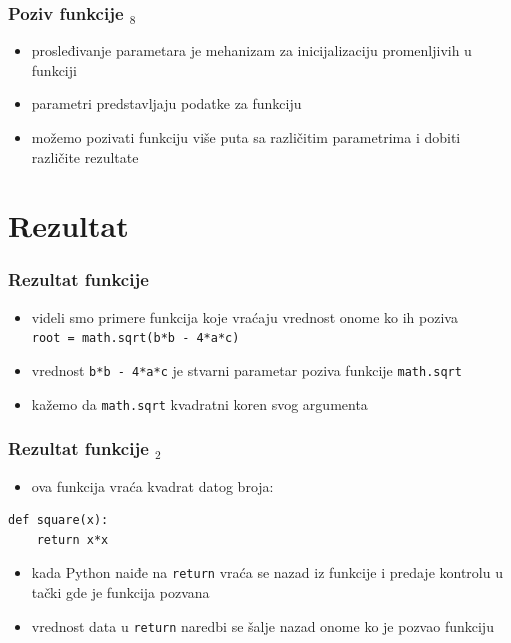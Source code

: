 \documentclass[compress]{beamer}
\begin{document}
\begin{frame}[fragile]
  \frametitle{Poziv funkcije $_8$}
  \begin{itemize}
    \item prosleđivanje parametara je mehanizam za inicijalizaciju promenljivih u funkciji
    \item parametri predstavljaju  podatke za funkciju
    \item možemo pozivati funkciju više puta sa različitim parametrima i dobiti različite rezultate
  \end{itemize}
\end{frame}

\section{Rezultat}

\begin{frame}[fragile]
  \frametitle{Rezultat funkcije}
  \begin{itemize}
    \item videli smo primere funkcija koje vraćaju vrednost onome ko ih poziva \\
      \texttt{root = math.sqrt(b*b - 4*a*c)}
    \item vrednost \texttt{b*b - 4*a*c} je stvarni parametar poziva funkcije \texttt{math.sqrt}
    \item kažemo da \texttt{math.sqrt}  kvadratni koren svog argumenta
  \end{itemize}
\end{frame}

\begin{frame}[fragile]
  \frametitle{Rezultat funkcije $_2$}
  \begin{itemize}
    \item ova funkcija vraća kvadrat datog broja: \\
  \end{itemize}
\begin{verbatim}
def square(x):
    return x*x
\end{verbatim}
  \begin{itemize}
    \item kada Python naiđe na \texttt{return} vraća se nazad iz funkcije i predaje kontrolu u tački gde je funkcija pozvana
    \item vrednost data u \texttt{return} naredbi se šalje nazad onome ko je pozvao funkciju
  \end{itemize}
\end{frame}
\end{document}
